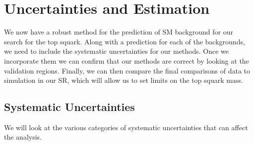 \chapter{Uncertainties and Estimation}
\label{ch:UncertandEst}

We now have a robust method for the prediction of SM background for our search for the top squark. Along with a prediction for each of the backgrounds, we need to include the systematic uncertainties for our methods. Once we incorporate them we can confirm that our methods are correct by looking at the validation regions. Finally, we can then compare the final comparisons of data to simulation in our SR, which will allow us to set limits on the top squark mass. 

\section{Systematic Uncertainties}\label{sec:Uncert}
We will look at the various categories of systematic uncertainties that can affect the analysis. 
